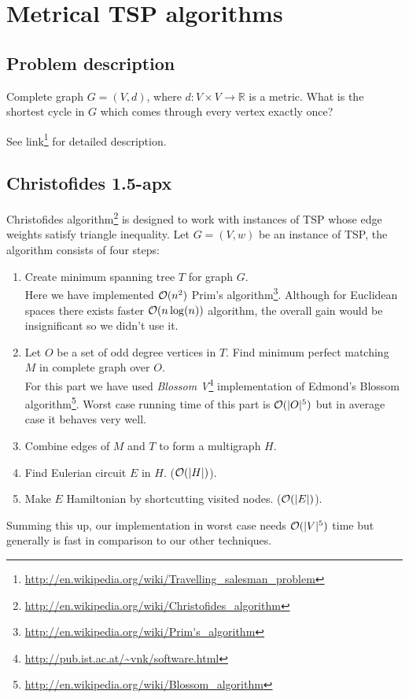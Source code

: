 \chapter{Metrical TSP algorithms}


\section{Problem description}

{ Complete graph $G = (V,d)$, where $d:V \times V \to\mathbb{R}$ is a metric. }
{ What is the shortest cycle in $G$ which comes through every vertex exactly once? }

See link\footnote{\url{http://en.wikipedia.org/wiki/Travelling_salesman_problem}}
for detailed description.

\section{Christofides 1.5-apx}
Christofides algorithm\footnote{\url{http://en.wikipedia.org/wiki/Christofides_algorithm}} is designed to work with instances of TSP whose edge
weights satisfy triangle inequality. Let $G=(V, w)$ be an instance of TSP,
the algorithm consists of four steps:
\begin{enumerate}
\item Create minimum spanning tree $T$ for graph $G$. \\
Here we have implemented $\mathcal{O}(n^2)$ Prim's algorithm\footnote{\url{http://en.wikipedia.org/wiki/Prim's_algorithm}}.
Although for Euclidean spaces there exists faster $\mathcal{O}(n\log(n))$ algorithm, the overall gain
would be insignificant so we didn't use it.
\item Let $O$ be a set of odd degree vertices in $T$.
	  Find minimum perfect matching $M$ in complete graph over $O$. \\
For this part we have used \emph{Blossom V}\footnote{\url{http://pub.ist.ac.at/~vnk/software.html}}
implementation of Edmond's Blossom algorithm\footnote{\url{http://en.wikipedia.org/wiki/Blossom_algorithm}}.
Worst case running time of this part is $\mathcal{O}(|O|^5)$ but in average case it behaves very well.
\item Combine edges of $M$ and $T$ to form a multigraph $H$.
\item Find Eulerian circuit $E$ in $H$. ($\mathcal{O}(|H|)$).
\item Make $E$ Hamiltonian by shortcutting visited nodes. ($\mathcal{O}(|E|)$).
\end{enumerate}
Summing this up, our implementation in worst case needs $\mathcal{O}(|V|^5)$ time but generally
is fast in comparison to our other techniques.

